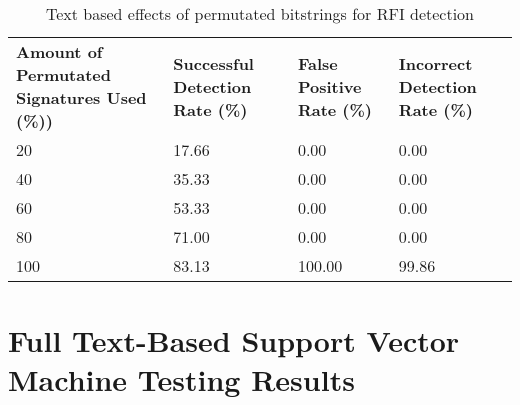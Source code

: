 \begin{appendices}
\begin{table}[H]
	\centering
	\begin{tabular}{|p{1.5in}|p{1in}|p{1in}|p{1in}|}
	\hline
	\textbf{Amount of Permutated Signatures Used (\%))} & \textbf{Successful Detection Rate (\%)} & \textbf{False Positive Rate (\%)} & \textbf{Incorrect Detection Rate (\%)}  \\
	\hhline{|=|=|=|=|}
	20	& 17.66	& 0.00 &	0.00 \\ \hline
	40	& 35.33 & 0.00 &	0.00 \\ \hline
	60	& 53.33	& 0.00 &	0.00 \\ \hline
	80	& 71.00 & 0.00 & 0.00 \\ \hline
	100	& 83.13 & 100.00 & 99.86 \\ \hline
	\end{tabular}
	\caption[]{Text based effects of permutated bitstrings for RFI detection}
	\label{app:rfiRandomText}
\end{table}


\chapter{Full Text-Based Support Vector Machine Testing Results} \label{app:svmFullResults}


\end{appendices}
